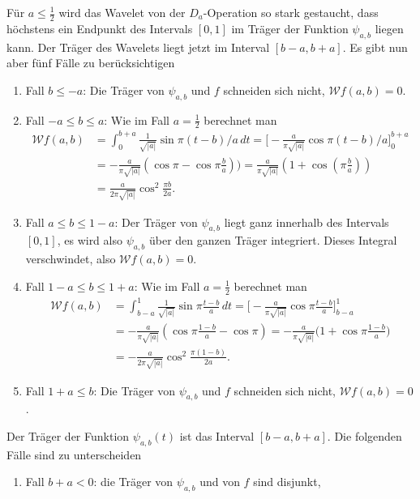 \begin{loesung}
\begin{teilaufgaben}
%
\item
Für $a\le\frac12$ wird das Wavelet von der $D_a$-Operation so stark gestaucht,
dass höchstens ein Endpunkt des Intervals $[0,1]$ im Träger der Funktion
$\psi_{a,b}$ liegen kann.
Der Träger des Wavelets liegt jetzt im Interval $[b-a,b+a]$.
Es gibt nun aber fünf Fälle zu berücksichtigen
\begin{enumerate}
\item Fall $b\le -a$:
Die Träger von $\psi_{a,b}$ und $f$ schneiden
sich nicht, $\mathcal{W}f(a,b)=0$.
\item Fall $-a\le b \le a$:
Wie im Fall $a=\frac12$ berechnet man
\begin{align*}
\mathcal{W}f(a,b)
&=
\int_{0}^{b+a} \frac{1}{\sqrt{|a|}} \sin \pi(t-b)/a\,dt
=
\biggl[
-
\frac{a}{\pi\sqrt{|a|}}
\cos \pi(t-b)/a
\biggr]_0^{b+a}
\\
&=
-\frac{a}{\pi\sqrt{|a|}}(\cos\pi - \cos\pi \frac{b}{a}))
=
\frac{a}{\pi\sqrt{|a|}}(1+\cos(\pi \frac{b}{a}))
\\
&=
\frac{a}{2\pi\sqrt{|a|}}\cos^2\frac{\pi b}{2a}.
\end{align*}
\item Fall $a\le b \le 1-a$:
Der Träger von $\psi_{a,b}$ liegt ganz innerhalb des Intervals $[0,1]$,
es wird also $\psi_{a,b}$ über den ganzen Träger integriert.
Dieses Integral verschwindet, also 
$\mathcal{W}f(a,b)=0$.
\item Fall $1-a\le b \le 1 +a$:
Wie im Fall $a=\frac12$ berechnet man
\begin{align*}
\mathcal{W}f(a,b)
&=
\int_{b-a}^{1} \frac{1}{\sqrt{|a|}} \sin \pi\frac{t-b}{a}\,dt
=
\biggl[
-
\frac{a}{\pi\sqrt{|a|}}
\cos \pi\frac{t-b}{a}
\biggr]_{b-a}^1
\\
&=
-\frac{a}{\pi\sqrt{|a|}}(
\cos\pi \frac{1-b}{a}
-
\cos\pi 
)
=
-\frac{a}{\pi\sqrt{|a|}}\biggl(1+\cos\pi\frac{1- b}{a}\biggr)
\\
&=
-\frac{a}{2\pi\sqrt{|a|}}\cos^2\frac{\pi(1- b)}{2a}.
\end{align*}
\item Fall $1+a\le b$:
Die Träger von $\psi_{a,b}$ und $f$ schneiden
sich nicht, $\mathcal{W}f(a,b)=0$.
\end{enumerate}
%
%
\item
Der Träger der Funktion $\psi_{a,b}(t)$ ist das Interval $[b-a,b+a]$.
Die folgenden Fälle sind zu unterscheiden
\begin{enumerate}
\item
Fall $b+a < 0$: die Träger von $\psi_{a,b}$ und von $f$ sind disjunkt,

\end{enumerate}
\end{teilaufgaben}
\end{loesung}
